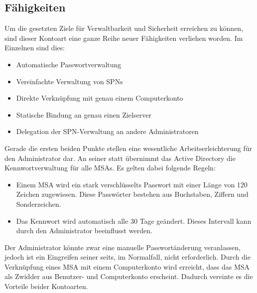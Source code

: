       \subsection{Fähigkeiten}
        Um die gesetzten Ziele für Verwaltbarkeit und Sicherheit erreichen zu
        können, sind dieser Kontoart eine ganze Reihe neuer Fähigkeiten
        verliehen worden. Im Einzelnen sind dies:
        \begin{itemize}
            \item Automatische Passwortverwaltung
            \item Vereinfachte Verwaltung von SPNs
            \item Direkte Verknüpfung mit genau einem Computerkonto
            \item Statische Bindung an genau einen Zielserver
            \item Delegation der SPN-Verwaltung an andere Administratoren
        \end{itemize}
        Gerade die ersten beiden Punkte stellen eine wesentliche
        Arbeitserleichterung für den Administrator dar. An seiner statt
        übernimmt das Active Directory die Kennwortverwaltung für alle MSAs. Es
        gelten dabei folgende Regeln:
\clearpage
        \begin{itemize}
            \item Einem MSA wird ein stark verschlüsselts Passwort mit einer Länge
            von 120 Zeichen zugewiesen. Diese Passwörter bestehen aus Buchstaben,
            Ziffern und Sonderzeichen.
            \item Das Kennwort wird automatisch alle 30 Tage geändert. Dieses
            Intervall kann durch den Administrator beeinflusst werden.
        \end{itemize}
        Der Administrator könnte zwar eine manuelle Passwortänderung
        veranlassen, jedoch ist ein Eingreifen seiner seits, im Normalfall,
        nicht erforderlich. Durch die Verknüpfung eines MSA mit einem
        Computerkonto wird erreicht, dass das MSA als Zwidder aus Benutzer- und
        Computerkonto erscheint. Dadurch vereinte es die Vorteile beider
        Kontoarten.

